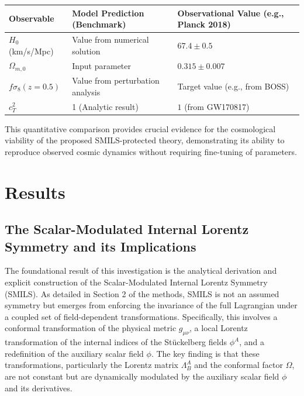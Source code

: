 \documentclass[twocolumn]{aastex631}
\begin{document}
\begin{enumerate}
    \begin{center}
    \begin{tabular}{|l|l|l|}
    \hline
    \textbf{Observable} & \textbf{Model Prediction (Benchmark)} & \textbf{Observational Value (e.g., Planck 2018)} \\
    \hline
    $H_0$ (km/s/Mpc) & Value from numerical solution & $67.4 \pm 0.5$ \\
    $\Omega_{m,0}$ & Input parameter & $0.315 \pm 0.007$ \\
    $f\sigma_8(z=0.5)$ & Value from perturbation analysis & Target value (e.g., from BOSS) \\
    $c_T^2$ & 1 (Analytic result) & $1$ (from GW170817) \\
    \hline
    \end{tabular}
    \end{center}
    This quantitative comparison provides crucial evidence for the cosmological viability of the proposed SMILS-protected theory, demonstrating its ability to reproduce observed cosmic dynamics without requiring fine-tuning of parameters.
\end{enumerate}

\section{Results}
\label{sec:results}
\subsection{The Scalar-Modulated Internal Lorentz Symmetry and its Implications}
The foundational result of this investigation is the analytical derivation and explicit construction of the Scalar-Modulated Internal Lorentz Symmetry (SMILS). As detailed in Section 2 of the methods, SMILS is not an assumed symmetry but emerges from enforcing the invariance of the full Lagrangian under a coupled set of field-dependent transformations. Specifically, this involves a conformal transformation of the physical metric $g_{\mu\nu}$, a local Lorentz transformation of the internal indices of the Stückelberg fields $\phi^A$, and a redefinition of the auxiliary scalar field $\phi$. The key finding is that these transformations, particularly the Lorentz matrix $\Lambda^A_B$ and the conformal factor $\Omega$, are not constant but are dynamically modulated by the auxiliary scalar field $\phi$ and its derivatives.
\end{document}
